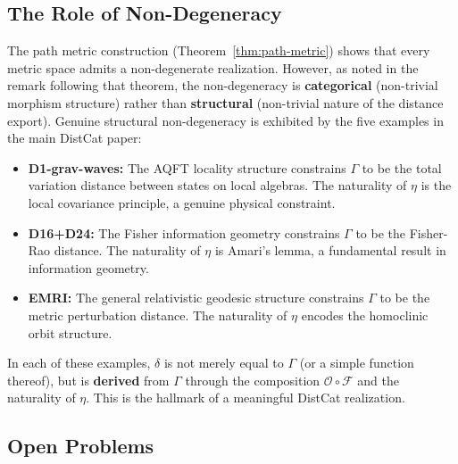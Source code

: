 \documentclass[11pt,a4paper]{article}
\begin{document}
\subsection{The Role of Non-Degeneracy}

The path metric construction (Theorem~\ref{thm:path-metric}) shows that every
metric space admits a non-degenerate realization. However, as noted in the
remark following that theorem, the non-degeneracy is \textbf{categorical}
(non-trivial morphism structure) rather than \textbf{structural} (non-trivial
nature of the distance export). Genuine structural non-degeneracy is
exhibited by the five examples in the main DistCat paper:

\begin{itemize}
\item \textbf{D1-grav-waves:} The AQFT locality structure constrains
$\Gamma$ to be the total variation distance between states on local
algebras. The naturality of $\eta$ is the local covariance principle,
a genuine physical constraint.
\item \textbf{D16+D24:} The Fisher information geometry constrains
$\Gamma$ to be the Fisher-Rao distance. The naturality of $\eta$ is
Amari's lemma, a fundamental result in information geometry.
\item \textbf{EMRI:} The general relativistic geodesic structure constrains
$\Gamma$ to be the metric perturbation distance. The naturality of $\eta$
encodes the homoclinic orbit structure.
\end{itemize}

In each of these examples, $\delta$ is not merely equal to $\Gamma$ (or
a simple function thereof), but is \textbf{derived} from $\Gamma$ through
the composition $\mathcal{O}\circ\mathcal{F}$ and the naturality of $\eta$.
This is the hallmark of a meaningful DistCat realization.

\subsection{Open Problems}
\end{document}

